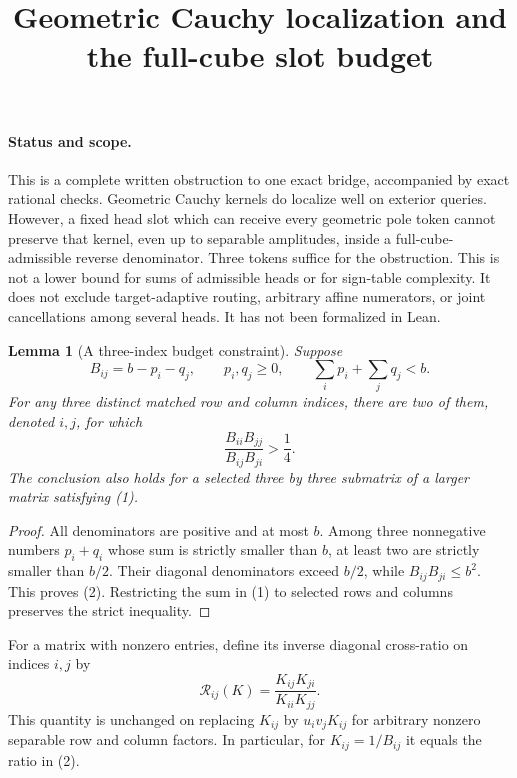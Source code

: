 \documentclass[11pt]{article}
\title{Geometric Cauchy localization and the full-cube slot budget}
\author{}\date{}
\newtheorem{lemma}{Lemma}
\begin{document}
\maketitle

\paragraph{Status and scope.}
This is a complete written obstruction to one exact bridge, accompanied
by exact rational checks. Geometric Cauchy kernels do localize well on
exterior queries. However, a fixed head slot which can receive every
geometric pole token cannot preserve that kernel, even up to separable
amplitudes, inside a full-cube-admissible reverse denominator. Three
tokens suffice for the obstruction. This is not a lower bound for sums
of admissible heads or for sign-table complexity. It does not exclude
target-adaptive routing, arbitrary affine numerators, or joint
cancellations among several heads. It has not been formalized in Lean.

\begin{lemma}[A three-index budget constraint]
Suppose
\[
 B_{ij}=b-p_i-q_j,\qquad p_i,q_j\geq0,\qquad
 \sum_i p_i+\sum_jq_j<b.                                      \tag{1}
\]
For any three distinct matched row and column indices, there are two
of them, denoted $i,j$, for which
\[
 \frac{B_{ii}B_{jj}}{B_{ij}B_{ji}}>\frac14.                    \tag{2}
\]
The conclusion also holds for a selected three by three submatrix of
a larger matrix satisfying (1).
\end{lemma}
\begin{proof}
All denominators are positive and at most $b$. Among three nonnegative
numbers $p_i+q_i$ whose sum is strictly smaller than $b$, at least two
are strictly smaller than $b/2$. Their diagonal denominators exceed
$b/2$, while $B_{ij}B_{ji}\leq b^2$. This proves (2).
Restricting the sum in (1) to selected rows and columns preserves the
strict inequality.
\end{proof}

For a matrix with nonzero entries, define its inverse diagonal
cross-ratio on indices $i,j$ by
\[
 \mathcal R_{ij}(K)=\frac{K_{ij}K_{ji}}{K_{ii}K_{jj}}.          \tag{3}
\]
This quantity is unchanged on replacing $K_{ij}$ by $u_i v_j K_{ij}$
for arbitrary nonzero separable row and column factors. In particular,
for $K_{ij}=1/B_{ij}$ it equals the ratio in (2).
\end{document}
